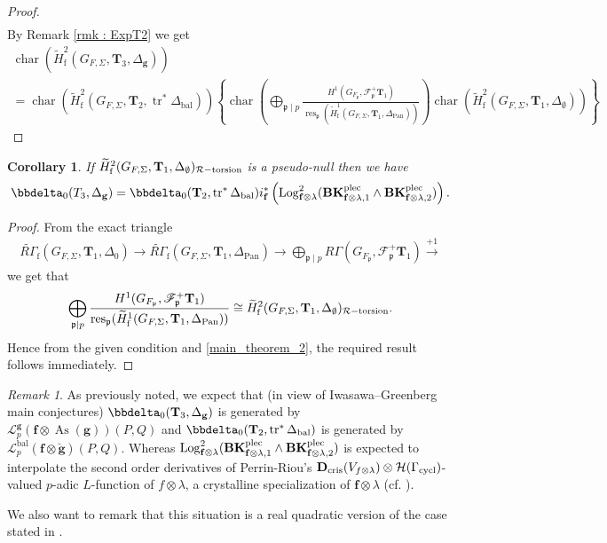 \documentclass[10pt]{amsart}
\numberwithin{equation}{section}
\newtheorem{cor}[thm]{Corollary}
\theoremstyle{definition}
\theoremstyle{remark} %
\newtheorem{rmk}[thm]{Remark}
\newcommand{\mbf}{\mathbf}
\newcommand{\scr}{\mathscr}
\newcommand{\mrm}{\mathrm}
\newcommand{\cal}{\mathcal}
\newcommand{\As}{\operatorname{As}}
\DeclareMathOperator{\Char}{char}
\newcommand{\Log}{\operatorname{Log}}
\newcommand{\pan}{\mathrm{Pan}}
\DeclareMathOperator{\res}{res}
\renewcommand{\b}{\mathrm{bal}}
\newcommand{\f}{\mathbf{f}}
\newcommand{\scrF}{\mathscr{F}}
\newcommand{\g}{\mathbf{g}}
\newcommand{\G}{G_{F,\Sigma}}
\newcommand{\p}{\mathfrak{p}}
\newcommand{\R}{\mathcal{R}}
\newcommand{\T}{\mathbf{T}}
\newcommand{\dcom}{\widetilde{R\Gamma}_{\mathrm{f}}}
\begin{document}
\begin{proof}
\begin{multline}
			\end{multline}
			By Remark \ref{rmk : ExpT2} we get
			\begin{multline}
				\Char \left( \widetilde{H}^2_{\mathrm{f}}(G_{F,\Sigma}, \T_3, \Delta_{\g})  \right) \\
				= \Char(\widetilde{H}^2_{\mathrm{f}}(G_{F,\Sigma}, \T_2, \operatorname{tr}^*\Delta_{\mathrm{bal}}))
				\left\lbrace \Char\left( \bigoplus_{\p \mid p}\frac{H^1(G_{F_\p},\scrF^+_\p \T_{1})}{\res_{\p}(\widetilde{H}^1_{\mathrm{f}}(G_{F,\Sigma},\T_{1}, \Delta_{\pan})) }\right) \Char(\widetilde{H}^2_{\mathrm{f}}(G_{F,\Sigma}, \T_1, \Delta_{\emptyset})) \right\rbrace 
			\end{multline}
			
		\end{proof}
		\begin{cor}
			\label{cor_main_2} 
			If $ \widetilde{H}^2_{\mathrm{f}}(G_{F,\Sigma}, \T_1, \Delta_{\emptyset})_{\R\rm -torsion} $ is a pseudo-null then we have 
			\begin{align}
				\label{7.26}
				\bbdelta_0(T_3, \Delta_{\g})= \bbdelta_0(\T_2, \operatorname{tr}^*\Delta_{\mathrm{bal}}) 
				i_\f^*\left( \Log^2_{\f \otimes \lambda}(\mathbf{BK}^{\rm plec}_{\f \otimes \lambda, 1} \wedge \mathbf{BK}^{\rm plec}_{\f \otimes \lambda, 2} ) \right) .
			\end{align}
		\end{cor}
		\begin{proof}
			From the exact triangle 
			\begin{align}
				\dcom(\G, \T_{1}, \Delta_0) \rightarrow \dcom(\G, \T_{1}, \Delta_\pan) \rightarrow \bigoplus_{\p \mid p} R\Gamma (G_{F_\p}, \scrF_{\p}^+ \T_{1}) \xrightarrow{+1}
			\end{align}
			we get that 
			\[\bigoplus_{\p \mid p}\frac{H^1(G_{F_\p},\scrF^+_\p \T_{1})}{\res_{\p}(\widetilde{H}^1_{\mathrm{f}}(G_{F,\Sigma},\T_{1}, \Delta_{\pan})) } \cong \widetilde{H}^2_{\mathrm{f}}(G_{F,\Sigma}, \T_1, \Delta_{\emptyset})_{\R\rm -torsion}.  \]
			Hence from the given condition and \cref{main_theorem_2}, the required result follows immediately.
		\end{proof}
		\begin{rmk}
			As previously noted, we expect that (in view of Iwasawa–Greenberg main conjectures) $ \bbdelta_0(\T_{3}, \Delta_{\g}) $ is generated by $ 	\scr{L}_p^{\g}(\f \otimes \As(\g) )(P,Q)  $ and $ \bbdelta_0(\T_2, \operatorname{tr}^*\Delta_{\mathrm{bal}}) $ is generated by $ \scr{L}_p^{\b}(\f \otimes \breve{\g} )(P,Q) $. Whereas $  \Log^2_{\f \otimes \lambda}(\mathbf{BK}^{\rm plec}_{\f \otimes \lambda, 1} \wedge \mathbf{BK}^{\rm plec}_{\f \otimes \lambda, 2} )$ is expected to interpolate the second order derivatives of Perrin-Riou's $ \mbf D_{\rm cris}(V_{f \otimes \lambda}) \otimes \cal{H}(\Gamma_{\mrm{cycl}}) $-valued $ p $-adic $ L $-function of $ f \otimes \lambda $, a crystalline specialization of $ \f \otimes\lambda $ (cf. \cite{PR93,perrin-riou_padic}). 
			
			We also want to remark that this situation is a real quadratic version of the case stated in \cite[.3]{Darmon16GenralisedKatoClasses}.
		\end{rmk}
		
\end{document}
